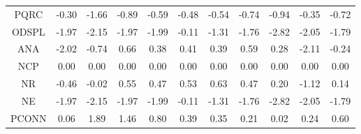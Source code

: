 \begin{longtable}{ | c || c | c | c | c | c | c | c | c | c || c |}
PQRC &  \cellcolor[HTML]{FFF7F7} -0.30 &  \cellcolor[HTML]{FFD7D7} -1.66 &  \cellcolor[HTML]{FFE7E7} -0.89 &  \cellcolor[HTML]{FFEFEF} -0.59 &  \cellcolor[HTML]{FFEFEF} -0.48 &  \cellcolor[HTML]{FFEFEF} -0.54 &  \cellcolor[HTML]{FFEFEF} -0.74 &  \cellcolor[HTML]{FFE7E7} -0.94 &  \cellcolor[HTML]{FFF7F7} -0.35 &  \cellcolor[HTML]{FFEFEF} -0.72 \\
ODSPL &  \cellcolor[HTML]{FFCFCF} -1.97 &  \cellcolor[HTML]{FFC7C7} -2.15 &  \cellcolor[HTML]{FFCFCF} -1.97 &  \cellcolor[HTML]{FFCFCF} -1.99 &  \cellcolor[HTML]{FFFFFF} -0.11 &  \cellcolor[HTML]{FFDFDF} -1.31 &  \cellcolor[HTML]{FFCFCF} -1.76 &  \cellcolor[HTML]{FFB7B7} -2.82 &  \cellcolor[HTML]{FFCFCF} -2.05 &  \cellcolor[HTML]{FFCFCF} -1.79 \\
ANA &  \cellcolor[HTML]{FFCFCF} -2.02 &  \cellcolor[HTML]{FFEFEF} -0.74 &  \cellcolor[HTML]{EFEFFF} 0.66 &  \cellcolor[HTML]{F7F7FF} 0.38 &  \cellcolor[HTML]{F7F7FF} 0.41 &  \cellcolor[HTML]{F7F7FF} 0.39 &  \cellcolor[HTML]{EFEFFF} 0.59 &  \cellcolor[HTML]{F7F7FF} 0.28 &  \cellcolor[HTML]{FFC7C7} -2.11 &  \cellcolor[HTML]{FFF7F7} -0.24 \\
NCP &  \cellcolor[HTML]{FFFFFF} 0.00 &  \cellcolor[HTML]{FFFFFF} 0.00 &  \cellcolor[HTML]{FFFFFF} 0.00 &  \cellcolor[HTML]{FFFFFF} 0.00 &  \cellcolor[HTML]{FFFFFF} 0.00 &  \cellcolor[HTML]{FFFFFF} 0.00 &  \cellcolor[HTML]{FFFFFF} 0.00 &  \cellcolor[HTML]{FFFFFF} 0.00 &  \cellcolor[HTML]{FFFFFF} 0.00 &  \cellcolor[HTML]{FFFFFF} 0.00 \\
NR &  \cellcolor[HTML]{FFF7F7} -0.46 &  \cellcolor[HTML]{FFFFFF} -0.02 &  \cellcolor[HTML]{EFEFFF} 0.55 &  \cellcolor[HTML]{F7F7FF} 0.47 &  \cellcolor[HTML]{EFEFFF} 0.53 &  \cellcolor[HTML]{EFEFFF} 0.63 &  \cellcolor[HTML]{F7F7FF} 0.47 &  \cellcolor[HTML]{F7F7FF} 0.20 &  \cellcolor[HTML]{FFDFDF} -1.12 &  \cellcolor[HTML]{FFFFFF} 0.14 \\
NE &  \cellcolor[HTML]{FFCFCF} -1.97 &  \cellcolor[HTML]{FFC7C7} -2.15 &  \cellcolor[HTML]{FFCFCF} -1.97 &  \cellcolor[HTML]{FFCFCF} -1.99 &  \cellcolor[HTML]{FFFFFF} -0.11 &  \cellcolor[HTML]{FFDFDF} -1.31 &  \cellcolor[HTML]{FFCFCF} -1.76 &  \cellcolor[HTML]{FFB7B7} -2.82 &  \cellcolor[HTML]{FFCFCF} -2.05 &  \cellcolor[HTML]{FFCFCF} -1.79 \\
PCONN &  \cellcolor[HTML]{FFFFFF} 0.06 &  \cellcolor[HTML]{CFCFFF} 1.89 &  \cellcolor[HTML]{D7D7FF} 1.46 &  \cellcolor[HTML]{E7E7FF} 0.80 &  \cellcolor[HTML]{F7F7FF} 0.39 &  \cellcolor[HTML]{F7F7FF} 0.35 &  \cellcolor[HTML]{F7F7FF} 0.21 &  \cellcolor[HTML]{FFFFFF} 0.02 &  \cellcolor[HTML]{F7F7FF} 0.24 &  \cellcolor[HTML]{EFEFFF} 0.60 \\

\end{longtable}
